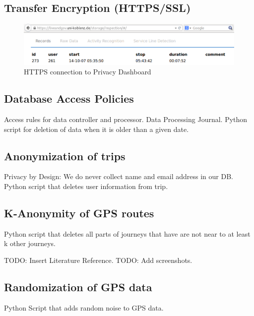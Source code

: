 \subsection{Transfer Encryption (HTTPS/SSL)}
\begin{figure}
\includegraphics[width=\textwidth]{screenshots/HTTPS.png}
\caption{HTTPS connection to Privacy Dashboard}
\end{figure}

\subsection{Database Access Policies}
Access rules for data controller and processor.
Data Processing Journal.
Python script for deletion of data when it is older than a given date.

\subsection{Anonymization of trips}
Privacy by Design: We do never collect name and email address in our DB.
Python script that deletes user information from trip.

\subsection{K-Anonymity of GPS routes}
Python script that deletes all parts of journeys that have are not near to at least k other journeys.

TODO: Insert Literature Reference.
TODO: Add screenshots.

\subsection{Randomization of GPS data}
Python Script that adds random noise to GPS data.
